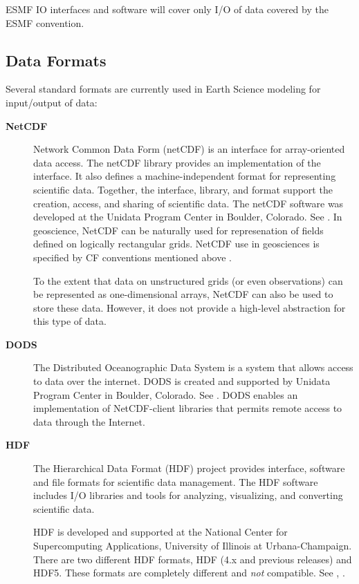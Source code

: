 ESMF I\/O interfaces and software will cover only I/O of data covered by
the ESMF convention.




\subsection{Data Formats}



Several standard formats are currently used in Earth Science modeling
for input/output of data:

\begin{description}
\item[\bf NetCDF] Network Common Data Form (netCDF) is an interface for 
array-oriented data access. The netCDF library provides an
implementation of the interface. It also defines a 
machine-independent format for representing scientific data. Together,
the interface, library, and format support the creation, access, and
sharing of scientific data. The netCDF software was developed at the
Unidata Program Center in Boulder, Colorado. See \cite{NetCDF3_UsersGuide_C}.
In geoscience, NetCDF can be naturally used for represenation of fields 
defined on logically rectangular grids. NetCDF use in geosciences is 
specified by CF conventions mentioned above \cite{NetCDF_CF_v1_beta3}. 

To the extent that data on unstructured grids (or even observations) can be 
represented as one-dimensional arrays, NetCDF can also be used to store these 
data. However, it does not provide a high-level abstraction for this type of 
data. 

\item[\bf DODS] The Distributed Oceanographic Data System is a system that 
allows access to data over the internet. DODS is created and supported by 
Unidata Program Center in Boulder, Colorado. See \cite{DODS}. DODS enables an 
implementation of NetCDF-client libraries that permits remote access to data 
through the Internet.


\item[\bf HDF] The Hierarchical Data Format (HDF) project provides
interface,  software and file formats for scientific data management. 
The HDF software includes I/O libraries and tools for analyzing,
visualizing, and converting scientific data. 

HDF is developed and supported at the National Center for Supercomputing 
Applications, University of Illinois at Urbana-Champaign. There are two 
different HDF formats, HDF (4.x and previous releases) and HDF5. These 
formats are completely different and {\it not} compatible.  See
\cite{HDF4_tutorials}, \cite{HDF5_tutorial}.


\end{description}
